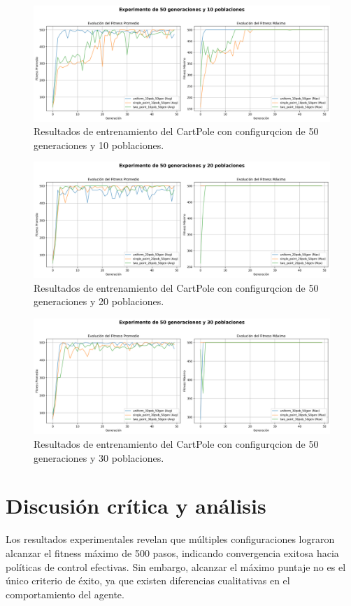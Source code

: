 \documentclass[12pt,a4paper]{article}
\begin{document}
\begin{figure}[H]
  \centering
  \includegraphics[width=1\textwidth]{img/50-gen-10-pob-results.png}
  \caption{Resultados de entrenamiento del CartPole con configurqcion de 50 generaciones y 10 poblaciones.}
\end{figure}

\begin{figure}[H]
  \centering
  \includegraphics[width=1\textwidth]{img/50-gen-20-pob-results.png}
  \caption{Resultados de entrenamiento del CartPole con configurqcion de 50 generaciones y 20 poblaciones.}
\end{figure}

\begin{figure}[H]
  \centering
  \includegraphics[width=1\textwidth]{img/50-gen-30-pob-results.png}
  \caption{Resultados de entrenamiento del CartPole con configurqcion de 50 generaciones y 30 poblaciones.}
\end{figure}

\section{Discusión crítica y análisis}
Los resultados experimentales revelan que múltiples configuraciones lograron alcanzar el fitness máximo de 500 pasos, indicando convergencia exitosa hacia políticas de control efectivas. Sin embargo, alcanzar el máximo puntaje no es el único criterio de éxito, ya que existen diferencias cualitativas en el comportamiento del agente.
\end{document}

